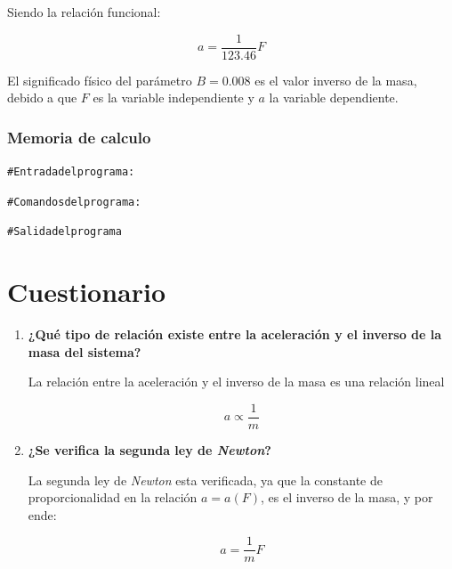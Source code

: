 \documentclass[letter,11pt]{article}
\begin{document}
Siendo la relación funcional:

\begin{equation}
    a = \frac{1}{123.46} F
\end{equation}

El significado físico del parámetro $B = 0.008$ es el valor inverso de la masa,
debido a que $F$ es la variable independiente y $a$ la variable dependiente.

\subsubsection{Memoria de calculo}

\begin{shaded}
\begin{alltt}
\footnotesize
\# Entrada del programa:


\# Comandos del programa:


\# Salida del programa

\normalsize
\end{alltt}
\end{shaded}

\section{Cuestionario}
\begin{enumerate}
\item \textbf{¿Qué tipo de relación existe entre la aceleración y el inverso de
    la masa del sistema?}

La relación entre la aceleración y el inverso de la masa es una relación lineal

\begin{equation*}
    a \propto \frac{1}{m}
\end{equation*}

\item \textbf{¿Se verifica la segunda ley de \emph{Newton}?}

La segunda ley de \emph{Newton} esta verificada, ya que la constante de
proporcionalidad en la relación $a = a(F)$, es el inverso de la masa, y por
ende:

\begin{equation*}
    a = \frac{1}{m} F
\end{equation*}

\end{enumerate}
\end{document}
